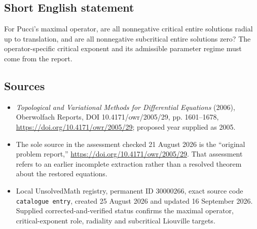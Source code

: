 \documentclass[11pt]{article}
\begin{document}
\subsection{Short English statement}
For Pucci's maximal operator, are all nonnegative critical entire solutions radial up to translation, and are all nonnegative subcritical entire solutions zero? The operator-specific critical exponent and its admissible parameter regime must come from the report.
\subsection{Sources}
\begin{itemize}
\item \emph{Topological and Variational Methods for Differential Equations} (2006), Oberwolfach Reports, DOI 10.4171/owr/2005/29, pp. 1601--1678, \url{https://doi.org/10.4171/owr/2005/29}; proposed year supplied as 2005.
\item The sole source in the assessment checked 21 August 2026 is the ``original problem report,'' \url{https://doi.org/10.4171/owr/2005/29}. That assessment refers to an earlier incomplete extraction rather than a resolved theorem about the restored equations.
\item Local UnsolvedMath registry, permanent ID $30000266$, exact source code \texttt{catalogue entry}, created 25 August 2026 and updated 16 September 2026. Supplied corrected-and-verified status confirms the maximal operator, critical-exponent role, radiality and subcritical Liouville targets.
\end{itemize}
\end{document}

